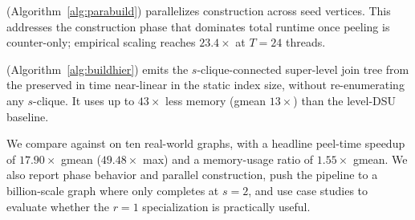 \paraBuild{} (Algorithm~\ref{alg:parabuild}) parallelizes \cpi{} construction across seed vertices.
%
This addresses the construction phase that dominates total runtime once peeling is counter-only; empirical scaling reaches $23.4\times$ at $T{=}24$ threads.

\buildHier{} (Algorithm~\ref{alg:buildhier}) emits the $s$-clique-connected super-level join tree from the preserved \cpi{} in time near-linear in the static index size, without re-enumerating any $s$-clique.
%
It uses up to $43\times$ less memory (gmean $13\times$) than the level-DSU baseline.

We compare against \cbnd{} on ten real-world graphs, with a headline peel-time speedup of $17.90\times$ gmean ($49.48\times$ max) and a memory-usage ratio of $1.55\times$ gmean.
%
We also report phase behavior and parallel construction, push the pipeline to a billion-scale graph where \cbnd{} only completes at $s{=}2$, and use case studies to evaluate whether the $r{=}1$ specialization is practically useful.
